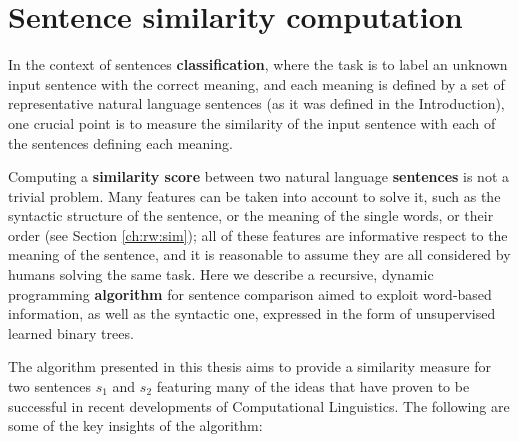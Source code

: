 
\chapter{Sentence similarity computation} %

\label{ch:M2} %


In the context of sentences \textbf{classification}, where the task is to label an unknown input sentence with the correct meaning, and each meaning is defined by a set of representative natural language sentences (as it was defined in the Introduction), one crucial point is to measure the similarity of the input sentence with each of the sentences defining each meaning.

Computing a \textbf{similarity score} between two natural language \textbf{sentences} is not a trivial problem. Many features can be taken into account to solve it, such as the syntactic structure of the sentence, or the meaning of the single words, or their order (see Section \ref{ch:rw:sim}); all of these features are informative respect to the meaning of the sentence, and it is reasonable to assume they are all considered by humans solving the same task. Here we describe a recursive, dynamic programming \textbf{algorithm} for sentence comparison aimed to exploit word-based information, as well as the syntactic one, expressed in the form of unsupervised learned binary trees.


The algorithm presented in this thesis aims to provide a similarity measure for two sentences $s_1$ and $s_2$ featuring many of the ideas that have proven to be successful in recent developments of Computational Linguistics. The following are some of the key insights of the algorithm:

